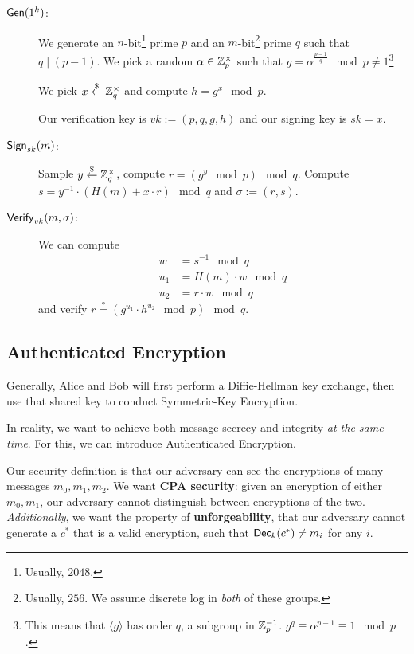 \begin{description}
    \item[$\operatorname{\mathsf{Gen}}(1^k)$:] We generate an $n$-bit\footnote{Usually, $2048$.} prime $p$ and an $m$-bit\footnote{Usually, $256$. We assume discrete log in \emph{both} of these groups.} prime $q$ such that $q\mid (p-1)$. We pick a random $\alpha\in\mathbb Z_p^\times$ such that $g = \alpha^{\frac{p-1}{q}}\mod{p}\neq 1$\footnote{This means that $\langle g\rangle$ has order $q$, a subgroup in $\mathbb Z_p^{-1}$. $g^q \equiv \alpha^{p-1}\equiv 1\mod{p}$. }

        We pick $x\overset{\$}{\leftarrow} \mathbb Z_q^\times$ and compute $h = g^x\mod{p}$.

        Our verification key is $vk := (p, q, g, h)$ and our signing key is $sk = x$.

    \item[$\operatorname{\mathsf{Sign}}_{sk}(m)$:] Sample $y \overset{\$}{\leftarrow} \mathbb Z_q^\times$, compute $r = (g^y\mod{p})\mod{q}$. Compute $s = y^{-1}\cdot(H(m) + x\cdot r)\mod{q}$ and $\sigma := (r, s)$.

    \item[$\operatorname{\mathsf{Verify}}_{vk}(m, \sigma)$:] We can compute
        \begin{align*}
            w   & = s^{-1}\mod{q}       \\
            u_1 & = H(m)\cdot w \mod{q} \\
            u_2 & = r\cdot w\mod{q}
        \end{align*}
        and verify $r\overset{?}{=}\left( g^{u_1}\cdot h^{u_2}\mod{p} \right)\mod{q}$.
\end{description}

\subsection{Authenticated Encryption}
Generally, Alice and Bob will first perform a Diffie-Hellman key exchange, then use that shared key to conduct Symmetric-Key Encryption.


In reality, we want to achieve both message secrecy and integrity \emph{at the same time}. For this, we can introduce Authenticated Encryption.

Our security definition is that our adversary can see the encryptions of many messages $m_0, m_1, m_2$. We want \textbf{CPA security}: given an encryption of either $m_0, m_1$, our adversary cannot distinguish between encryptions of the two. \emph{Additionally}, we want the property of \textbf{unforgeability}, that our adversary cannot generate a $c^*$ that is a valid encryption, such that $\operatorname{\mathsf{Dec}}_{k}(c^*)\neq m_i$ for any $i$.

